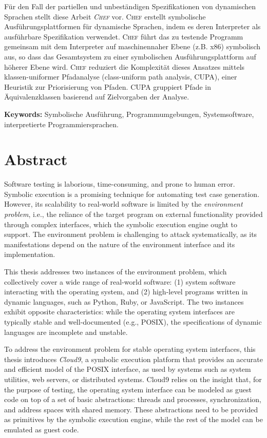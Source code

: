 \documentclass[letterpaper,10pt,oneside]{book}
\newcommand{\cnine}{Cloud9\xspace}
\newcommand{\chef}{\textsc{Chef}\xspace}
\begin{document}
Für den Fall der partiellen und unbeständigen Spezifikationen von dynamischen Sprachen stellt diese Arbeit \emph{\chef} vor. \chef erstellt symbolische Ausführungsplattformen für dynamische Sprachen, indem es deren Interpreter als ausführbare Spezifikation verwendet. \chef führt das zu testende Programm gemeinsam mit dem Interpreter auf maschinennaher Ebene (z.B. x86) symbolisch aus, so dass das Gesamtsystem zu einer symbolischen Ausführungsplattform auf höherer Ebene wird. \chef reduziert die Komplexität dieses Ansatzes mittels klassen-uniformer Pfadanalyse (class-uniform path analysis, CUPA), einer Heuristik zur Priorisierung von Pfaden. CUPA gruppiert Pfade in Äquivalenzklassen basierend auf Zielvorgaben der Analyse. 

\noindent \textbf{Keywords:} Symbolische Ausführung, Programmumgebungen, Systemsoftware, interpretierte Programmiersprachen.

\chapter*{Abstract}

Software testing is laborious, time-consuming, and prone to human error.  Symbolic execution is a promising technique for automating test case generation.  However, its scalability to real-world software is limited by the \emph{environment problem}, i.e., the reliance of the target program on external functionality provided through complex interfaces, which the symbolic execution engine ought to support.
%
The environment problem is challenging to attack systematically, as its manifestations depend on the nature of the environment interface and its implementation.

This thesis addresses two instances of the environment problem, which collectively cover a wide range of real-world software: (1) system software interacting with the operating system, and (2) high-level programs written in dynamic languages, such as Python, Ruby, or JavaScript.  The two instances exhibit opposite characteristics: while the operating system interfaces are typically stable and well-documented (e.g., POSIX), the specifications of dynamic languages are incomplete and unstable.

To address the environment problem for stable operating system interfaces, this thesis introduces \emph{\cnine}, a symbolic execution platform that provides an accurate and efficient model of the POSIX interface, as used by systems such as system utilities, web servers, or distributed systems.
%
\cnine relies on the insight that, for the purpose of testing, the operating system interface can be modeled as guest code on top of a set of basic abstractions: threads and processes, synchronization, and address spaces with shared memory. These abstractions need to be provided as primitives by the symbolic execution engine, while the rest of the model can be emulated as guest code.
\end{document}
